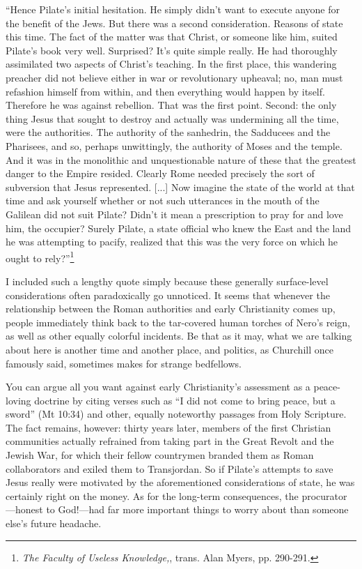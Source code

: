 \begin{smallquote}
    ``Hence Pilate's initial hesitation. He simply didn't want to execute anyone for the benefit of the Jews. But there was a second consideration. Reasons of state this time. The fact of the matter was that Christ, or someone like him, suited Pilate's book very well. Surprised? It's quite simple really. He had thoroughly assimilated two aspects of Christ's teaching. In the first place, this wandering preacher did not believe either in war or revolutionary upheaval; no, man must refashion himself from within, and then everything would happen by itself. Therefore he was against rebellion. That was the first point. Second: the only thing Jesus that sought to destroy and actually was undermining all the time, were the authorities. The authority of the sanhedrin, the Sadducees and the Pharisees, and so, perhaps unwittingly, the authority of Moses and the temple. And it was in the monolithic and unquestionable nature of these that the greatest danger to the Empire resided. Clearly Rome needed precisely the sort of subversion that Jesus represented. [...] Now imagine the state of the world at that time and ask yourself whether or not such utterances in the mouth of the Galilean did not suit Pilate? Didn't it mean a prescription to pray for and love him, the occupier? Surely Pilate, a state official who knew the East and the land he was attempting to pacify, realized that this was the very force on which he ought to rely?''\footnote{\emph{The Faculty of Useless Knowledge,}, trans. Alan Myers, pp. 290-291.}
\end{smallquote}

I included such a lengthy quote simply because these generally surface-level considerations often paradoxically go unnoticed. It seems that whenever the relationship between the Roman authorities and early Christianity comes up, people immediately think back to the tar-covered human torches of Nero's reign, as well as other equally colorful incidents. Be that as it may, what we are talking about here is another time and another place, and politics, as Churchill once famously said, sometimes makes for strange bedfellows.

You can argue all you want against early Christianity's assessment as a peace-loving doctrine by citing verses such as ``I did not come to bring peace, but a sword'' (Mt 10:34) and other, equally noteworthy passages from Holy Scripture. The fact remains, however: thirty years later, members of the first Christian communities actually refrained from taking part in the Great Revolt and the Jewish War, for which their fellow countrymen branded them as Roman collaborators and exiled them to Transjordan. So if Pilate's attempts to save Jesus really were motivated by the aforementioned considerations of state, he was certainly right on the money. As for the long-term consequences, the procurator---honest to God!---had far more important things to worry about than someone else's future headache.

